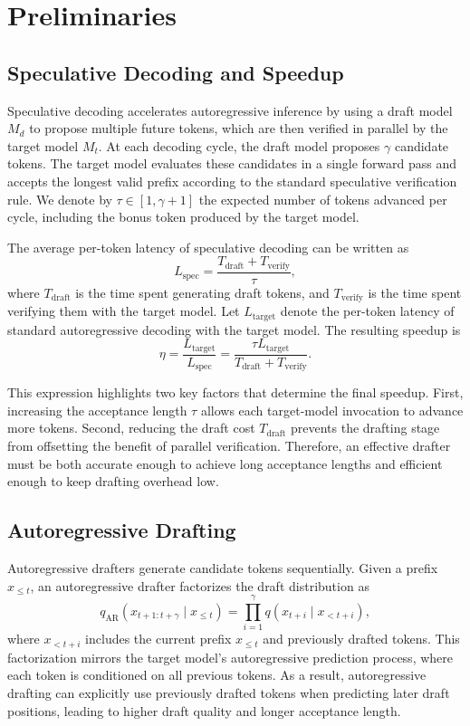 \documentclass{llmxive}
\begin{document}
\section{Preliminaries}
\subsection{Speculative Decoding and Speedup}
Speculative decoding accelerates autoregressive inference by using a draft model \(M_d\) to propose multiple future tokens, which are then verified in parallel by the target model \(M_t\). At each decoding cycle, the draft model proposes \(\gamma\) candidate tokens. The target model evaluates these candidates in a single forward pass and accepts the longest valid prefix according to the standard speculative verification rule. We denote by \(\tau \in [1, \gamma+1]\) the expected number of tokens advanced per cycle, including the bonus token produced by the target model.

The average per-token latency of speculative decoding can be written as
\[
L_{\mathrm{spec}}
=
\frac{T_{\mathrm{draft}} + T_{\mathrm{verify}}}{\tau},
\]
where \(T_{\mathrm{draft}}\) is the time spent generating draft tokens, and \(T_{\mathrm{verify}}\) is the time spent verifying them with the target model. Let \(L_{\mathrm{target}}\) denote the per-token latency of standard autoregressive decoding with the target model. The resulting speedup is
\[
\eta
=
\frac{L_{\mathrm{target}}}{L_{\mathrm{spec}}}
=
\frac{\tau L_{\mathrm{target}}}
{T_{\mathrm{draft}} + T_{\mathrm{verify}}}.
\]

This expression highlights two key factors that determine the final speedup. First, increasing the acceptance length \(\tau\) allows each target-model invocation to advance more tokens. Second, reducing the draft cost \(T_{\mathrm{draft}}\) prevents the drafting stage from offsetting the benefit of parallel verification. Therefore, an effective drafter must be both accurate enough to achieve long acceptance lengths and efficient enough to keep drafting overhead low.

\subsection{Autoregressive Drafting}

Autoregressive drafters generate candidate tokens sequentially. Given a prefix \(x_{\le t}\), an autoregressive drafter factorizes the draft distribution as
\[
q_{\mathrm{AR}}(x_{t+1:t+\gamma} \mid x_{\le t})
=
\prod_{i=1}^{\gamma}
q(x_{t+i} \mid x_{<t+i}),
\]
where \(x_{<t+i}\) includes the current prefix \(x_{\le t}\) and previously drafted tokens.
This factorization mirrors the target model's autoregressive prediction process, where each token is conditioned on all previous tokens. As a result, autoregressive drafting can explicitly use previously drafted tokens when predicting later draft positions, leading to higher draft quality and longer acceptance length.
\end{document}
